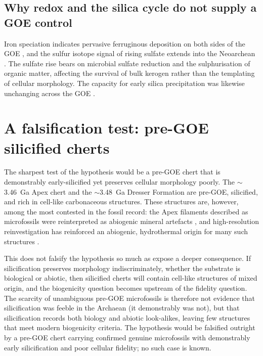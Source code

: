 \documentclass[11pt]{article}
\begin{document}
\subsection{Why redox and the silica cycle do not supply a GOE control}

Iron speciation indicates pervasive ferruginous deposition on both sides of the GOE
\citep{Canfield1998,Poulton2011}, and the sulfur isotope signal of rising sulfate extends into the
Neoarchean \citep{Reinhard2009,Philippot2018}. The sulfate rise bears on microbial sulfate
reduction and the sulphurisation of organic matter, affecting the survival of bulk kerogen rather
than the templating of cellular morphology. The capacity for early silica precipitation was likewise
unchanging across the GOE \citep{Siever1992,Perry2007}.

\section{A falsification test: pre-GOE silicified cherts}\label{sec:falsify}

The sharpest test of the hypothesis would be a pre-GOE chert that is demonstrably early-silicified
yet preserves cellular morphology poorly. The $\sim$3.46~Ga Apex chert and the $\sim$3.48~Ga Dresser
Formation are pre-GOE, silicified, and rich in cell-like carbonaceous structures. These structures
are, however, among the most contested in the fossil record: the Apex filaments described as
microfossils \citep{Schopf1993} were reinterpreted as abiogenic mineral artefacts
\citep{Brasier2002}, and high-resolution reinvestigation has reinforced an abiogenic, hydrothermal
origin for many such structures \citep{Wacey2014}.

This does not falsify the hypothesis so much as expose a deeper consequence. If silicification
preserves morphology indiscriminately, whether the substrate is biological or abiotic, then
silicified cherts will contain cell-like structures of mixed origin, and the biogenicity question
becomes upstream of the fidelity question. The scarcity of unambiguous pre-GOE microfossils is
therefore not evidence that silicification was feeble in the Archaean (it demonstrably was not), but
that silicification records both biology and abiotic look-alikes, leaving few structures that meet
modern biogenicity criteria. The hypothesis would be falsified outright by a pre-GOE chert carrying
confirmed genuine microfossils with demonstrably early silicification and poor cellular fidelity; no
such case is known.
\end{document}
